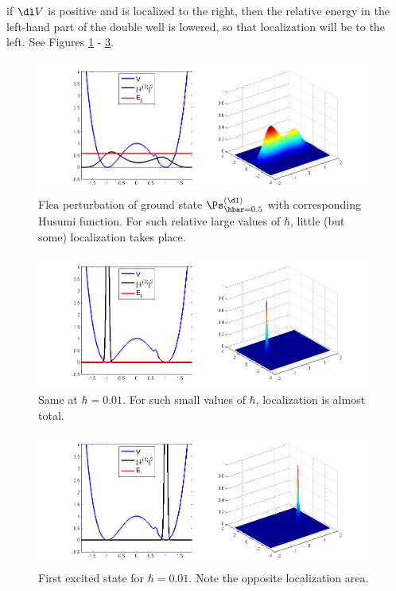 \documentclass[12pt]{article}
\begin{document}
if $\dl V$ is positive and is localized to the right, then the relative energy in the left-hand part of the double well is lowered, so that localization will be to the left. See Figures \ref{Fleap1} - \ref{Fleap3}.\newpage
 \begin{figure}[H]
\begin{center}
\includegraphics[width=0.98\textwidth]{KL2,hbar=0,5.png}
\caption{Flea perturbation of ground state $\Ps_{\hbar=0.5}^{(\dl)}$ with corresponding Husumi function. For such relative large values of $\hbar$, little (but some) localization takes place.}
\label{Fleap1}
\end{center}
\end{figure}\vspace*{-5mm}
\begin{figure}[H]
\begin{center}
\includegraphics[width=0.98\textwidth]{KL2,hbar=0,01-2.png}
\caption{Same at $\hbar=0.01$. For such small values of $\hbar$, localization is  almost total.}
\label{Fleap2}
\end{center}
\end{figure}\vspace*{-5mm}
\begin{figure}[H]
\begin{center}
\includegraphics[width=0.98\textwidth]{KL2,hbar=0,01-1-1.png}
\caption{First excited state for $\hbar=0.01$. Note the opposite localization area.}
\label{Fleap3}
\end{center}
\end{figure}
\end{document}
